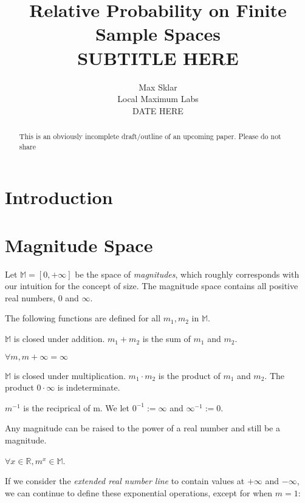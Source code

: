 \documentclass[twoside]{article}
\begin{document}
\parindent=0in
\parskip=12pt


\title{
  Relative Probability on Finite Sample Spaces \\
  \large{
    SUBTITLE HERE
  }
}

\author{Max Sklar\\ Local Maximum Labs \\ DATE HERE}
\date{}

\maketitle
\thispagestyle{empty}

\begin{abstract}
This is an obviously incomplete draft/outline of an upcoming paper. Please do not share
\end{abstract}

\section{Introduction}

\section{Magnitude Space}

Let \(\mathbb{M} = [0, +\infty]\) be the space of \textit{magnitudes}, which roughly corresponds with our intuition for the concept of size. The magnitude space contains all positive real numbers, \(0\) and \(\infty\).

The following functions are defined for all \(m_1, m_2\) in \(\mathbb{M}\).

\(\mathbb{M}\) is closed under addition. \(m_1 + m_2\) is the sum of \(m_1\) and \(m_2\).

\(\forall m, m + \infty = \infty\)

\(\mathbb{M}\) is closed under multiplication. \(m_1 \cdot m_2\) is the product of \(m_1\) and \(m_2\). The product \(0 \cdot \infty\) is indeterminate.

\(m^{-1}\) is the reciprical of m. We let \(0^{-1} := \infty\) and \(\infty^{-1} := 0\).

Any magnitude can be raised to the power of a real number and still be a magnitude.

\(\forall x \in \mathbb{R}, m^x \in \mathbb{M}\).

If we consider the \textit{extended real number line} to contain values at \(+\infty\) and \(-\infty\), we can continue to define these exponential operations, except for when \(m = 1\):
\end{document}
